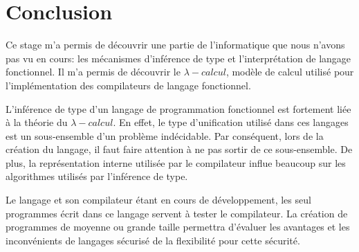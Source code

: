 \chapter{Conclusion}

Ce stage m'a permis de découvrir une partie de l'informatique que nous n'avons pas vu en cours:
les mécanismes d'inférence de type et l'interprétation de langage fonctionnel.
Il m'a permis de découvrir le $\lambda{}-calcul$, modèle de calcul utilisé pour l'implémentation des compilateurs
de langage fonctionnel.

L'inférence de type d'un langage de programmation fonctionnel est fortement liée à la théorie du $\lambda{}-calcul$.
En effet, le type d'unification utilisé dans ces langages est un sous-ensemble d'un problème indécidable.
Par conséquent, lors de la création du langage, il faut faire attention à ne pas sortir de ce sous-ensemble.
De plus, la représentation interne utilisée par le compilateur influe beaucoup sur les algorithmes
utilisés par l'inférence de type.

Le langage \typer{} et son compilateur étant en cours de développement, les
seul programmes écrit dans ce langage servent à tester le compilateur.
La création de programmes de moyenne ou grande taille permettra d'évaluer les avantages et les inconvénients de langages
sécurisé de la flexibilité pour cette sécurité.
